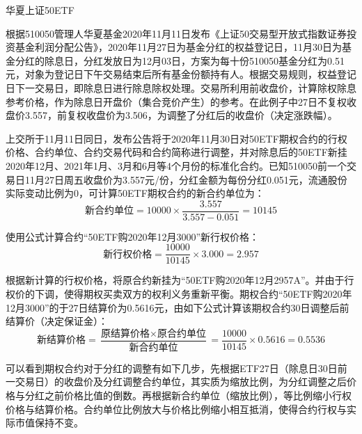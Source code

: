 \documentclass[11pt]{article}
\begin{document}
\begin{example}

华夏上证50ETF

根据510050管理人华夏基金2020年11月11日发布《上证50交易型开放式指数证券投资基金利润分配公告》，2020年11月27日为基金分红的权益登记日，11月30日为基金分红的除息日，分红发放日为12月03日，方案为每十份510050基金分红为0.51元，对象为登记日下午交易结束后所有基金份额持有人。根据交易规则，权益登记日下一交易日，即除息日进行除息除权处理。交易所利用前收盘价，计算除权除息参考价格，作为除息日开盘价（集合竞价产生）的参考。在此例子中27日不复权收盘价3.557，前复权收盘价为3.506，为调整了分红后的收盘价（决定涨跌幅）。

上交所于11月11日同日，发布公告将于2020年11月30日对50ETF期权合约的行权价格、合约单位、合约交易代码和合约简称进行调整，并对除息后的50ETF新挂2020年12月、2021年1月、3月和6月等4个月份的标准化合约。已知510050前一个交易日11月27日周五收盘价为3.557元/份，分红金额为每份分红0.051元，流通股份实际变动比例为0，可计算50ETF期权合约的新合约单位为：
\begin{equation*}
    \text{新合约单位} = 10000 \times \frac{3.557}{3.557-0.051} = 10145
\end{equation*}

使用公式计算合约“50ETF购2020年12月3000”新行权价格：
\begin{equation*}
    \text{新行权价格} = \frac{10000}{10145} \times 3.000 = 2.957
\end{equation*}

根据新计算的行权价格，将原合约新挂为“50ETF购2020年12月2957A”。并由于行权价的下调，使得期权买卖双方的权利义务重新平衡。期权合约“50ETF购2020年12月3000”的于27日结算价为0.5616元，由如下公式计算该期权合约30日调整后前结算价（决定保证金）：
\begin{equation*}
    \text{新结算价格} = \frac{\text{原结算价格}\times\text{原合约单位}}{\text{新合约单位}} = \frac{10000}{10145} \times 0.5616 = 0.5536
\end{equation*}

可以看到期权合约对于分红的调整有如下几步，先根据ETF27日（除息日30日前一交易日）的收盘价及分红调整合约单位，其实质为缩放比例，为分红调整之后价格与分红之前价格比值的倒数。再根据新合约单位（缩放比例），等比例缩小行权价格与结算价格。合约单位比例放大与价格比例缩小相互抵消，使得合约行权与实际市值保持不变。

\end{example}
\end{document}
